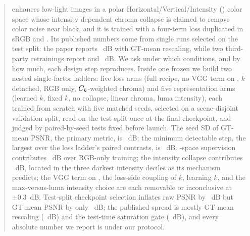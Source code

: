 \begin{abstract}
\mname enhances low-light images in a polar Horizontal/Vertical/Intensity (\hvi) color space
whose intensity-dependent chroma collapse is claimed to remove color noise near black, and it
is trained with a four-term loss duplicated in sRGB and \hvi. Its published \dataset numbers
come from single runs selected on the test split: the paper reports ~dB with
GT-mean rescaling, while two third-party retrainings report  and ~dB. We ask under which conditions, and by how much, each design step
reproduces. Inside one frozen \mname we build two nested single-factor ladders: five loss arms
(full recipe, no VGG term on \hvi, $k$ detached, RGB only, $\Ck$-weighted chroma) and five
representation arms (learned $k$, fixed $k$, no collapse, linear chroma, luma intensity), each
trained from scratch with five matched seeds, selected on a scene-disjoint validation split,
read on the test split once at the final checkpoint, and judged by paired-by-seed tests fixed
before launch. The seed SD of GT-mean PSNR, the primary metric, is ~dB; the minimum
detectable step, the largest over the loss ladder's paired contrasts, is ~dB.
\hvi-space supervision contributes ~dB over RGB-only training; the intensity collapse
contributes ~dB, located in the three darkest intensity deciles as its mechanism
predicts; the VGG term on \hvi, the loss-side coupling of $k$, learning $k$, and the
max-versus-luma intensity choice are each removable or inconclusive at $\pm 0.3$~dB. Test-split checkpoint selection inflates raw PSNR by ~dB but GT-mean PSNR by only
~dB; the published spread is mostly GT-mean rescaling (~dB) and the
test-time saturation gate (~dB), and every absolute number we report is under
our protocol.
\end{abstract}
